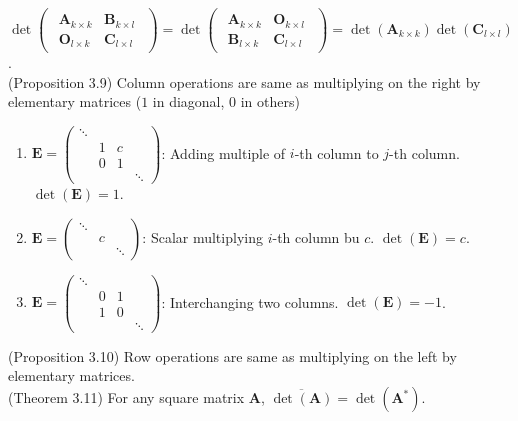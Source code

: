 \documentclass{article}
\theoremstyle{definition}
\begin{document}
$\det\begin{pmatrix}\begin{array}{c|c}
    \mathbf{A}_{k\times k} & \mathbf{B}_{k\times l}\\
    \hline
    \mathbf{O}_{l\times k} & \mathbf{C}_{l\times l}
\end{array}\end{pmatrix}=\det\begin{pmatrix}\begin{array}{c|c}
    \mathbf{A}_{k\times k} & \mathbf{O}_{k\times l}\\
    \hline
    \mathbf{B}_{l\times k} & \mathbf{C}_{l\times l}
\end{array}\end{pmatrix}=\det(\mathbf{A}_{k\times k})\det(\mathbf{C}_{l\times l})$.\\
(Proposition 3.9) Column operations are same as multiplying on the right by elementary matrices ($1$ in diagonal, $0$ in others)
\begin{enumerate}
    \item $\mathbf{E}=\begin{pmatrix}
        \ddots\\
        & 1 & c\\
        & 0 & 1\\
        & & & \ddots
    \end{pmatrix}$: Adding multiple of $i$-th column to $j$-th column. $\det(\mathbf{E})=1$.\\
    \item $\mathbf{E}=\begin{pmatrix}
        \ddots\\
        & c\\
        & & \ddots
    \end{pmatrix}$: Scalar multiplying $i$-th column bu $c$. $\det(\mathbf{E})=c$.\\
    \item $\mathbf{E}=\begin{pmatrix}
        \ddots\\
        & 0 & 1\\
        & 1 & 0\\
        & & & \ddots
    \end{pmatrix}$: Interchanging two columns. $\det(\mathbf{E})=-1$.
\end{enumerate}
(Proposition 3.10) Row operations are same as multiplying on the left by elementary matrices.\\
(Theorem 3.11) For any square matrix $\mathbf{A}$, $\overline{\det(\mathbf{A})}=\det(\mathbf{A}^{*})$.\\
\end{document}
